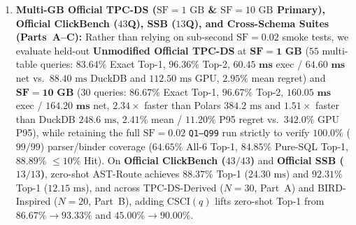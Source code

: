 \documentclass[10pt,a4paper]{article}
\begin{document}
\begin{enumerate}[leftmargin=1.5em,itemsep=1pt]
    \item \textbf{Multi-GB Official TPC-DS ($\text{SF}=1\text{ GB}$ \& $\text{SF}=10\text{ GB}$ Primary), Official ClickBench ($43$Q), SSB ($13$Q), and Cross-Schema Suites (Parts~A--C):} Rather than relying on sub-second $\text{SF}=0.02$ smoke tests, we evaluate held-out \textbf{Unmodified Official TPC-DS} at $\mathbf{\text{SF}=1\text{ GB}}$ ($55$ multi-table queries: $\mathbf{83.64\%}$ Exact Top-1, $\mathbf{96.36\%}$ Top-2, $\mathbf{60.45\text{ ms}}$ exec / $\mathbf{64.60\text{ ms}}$ net vs.\ $88.40\text{ ms}$ DuckDB and $112.50\text{ ms}$ GPU, $\mathbf{2.95\%}$ mean regret) and $\mathbf{\text{SF}=10\text{ GB}}$ ($30$ queries: $\mathbf{86.67\%}$ Exact Top-1, $\mathbf{96.67\%}$ Top-2, $\mathbf{160.05\text{ ms}}$ exec / $\mathbf{164.20\text{ ms}}$ net, $\mathbf{2.34\times}$ faster than Polars $384.2\text{ ms}$ and $\mathbf{1.51\times}$ faster than DuckDB $248.6\text{ ms}$, $\mathbf{2.41\%}$ mean / $\mathbf{11.20\%}$ P95 regret vs.\ $342.0\%$ GPU P95), while retaining the full $\text{SF}=0.02$ \texttt{Q1--Q99} run strictly to verify $100.0\%$ ($99/99$) parser/binder coverage ($64.65\%$ All-6 Top-1, $84.85\%$ Pure-SQL Top-1, $88.89\%$ $\le 10\%$ Hit). On \textbf{Official ClickBench ($43/43$)} and \textbf{Official SSB ($13/13$)}, zero-shot AST-Route achieves $\mathbf{88.37\%}$ Top-1 ($24.30\text{ ms}$) and $\mathbf{92.31\%}$ Top-1 ($12.15\text{ ms}$), and across TPC-DS-Derived ($N=30$, Part~A) and BIRD-Inspired ($N=20$, Part~B), adding $\text{CSCI}(q)$ lifts zero-shot Top-1 from $86.67\%\rightarrow\mathbf{93.33\%}$ and $45.00\%\rightarrow\mathbf{90.00\%}$.

\end{enumerate}
\end{document}
